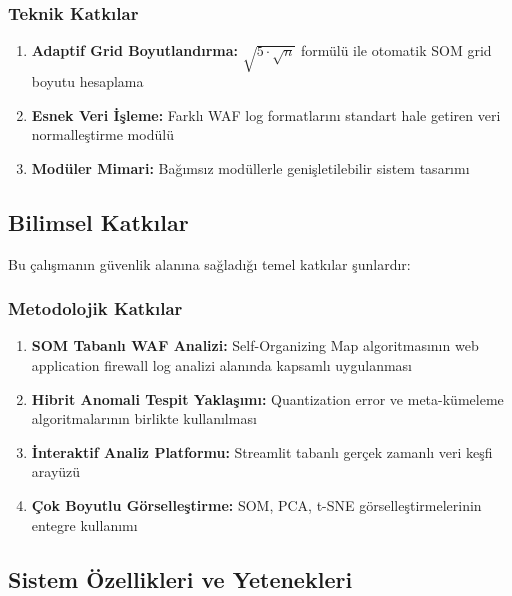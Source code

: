 \subsubsection{Teknik Katkılar}

\begin{enumerate}
    \item \textbf{Adaptif Grid Boyutlandırma:} $\sqrt{5 \cdot \sqrt{n}}$ formülü ile otomatik SOM grid boyutu hesaplama
    
    \item \textbf{Esnek Veri İşleme:} Farklı WAF log formatlarını standart hale getiren veri normalleştirme modülü
    
    \item \textbf{Modüler Mimari:} Bağımsız modüllerle genişletilebilir sistem tasarımı
\end{enumerate}


\subsection{Bilimsel Katkılar}

Bu çalışmanın güvenlik alanına sağladığı temel katkılar şunlardır:

\subsubsection{Metodolojik Katkılar}

\begin{enumerate}
    \item \textbf{SOM Tabanlı WAF Analizi:} Self-Organizing Map algoritmasının web application firewall log analizi alanında kapsamlı uygulanması
    
    \item \textbf{Hibrit Anomali Tespit Yaklaşımı:} Quantization error ve meta-kümeleme algoritmalarının birlikte kullanılması
    
    \item \textbf{İnteraktif Analiz Platformu:} Streamlit tabanlı gerçek zamanlı veri keşfi arayüzü
    
    \item \textbf{Çok Boyutlu Görselleştirme:} SOM, PCA, t-SNE görselleştirmelerinin entegre kullanımı
\end{enumerate}

\subsection{Sistem Özellikleri ve Yetenekleri}

